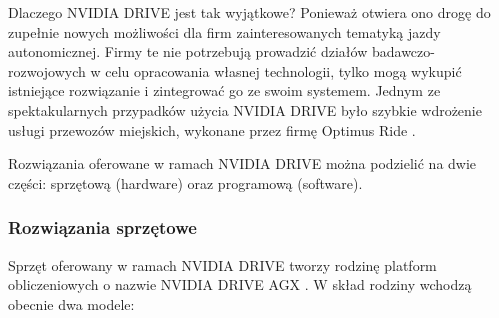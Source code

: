 Dlaczego NVIDIA DRIVE jest tak wyjątkowe? Ponieważ otwiera ono drogę do zupełnie nowych możliwości dla firm zainteresowanych tematyką jazdy autonomicznej. Firmy te nie potrzebują prowadzić działów badawczo-rozwojowych w celu opracowania własnej technologii, tylko mogą wykupić istniejące rozwiązanie i zintegrować go ze swoim systemem. Jednym ze spektakularnych przypadków użycia NVIDIA DRIVE było szybkie wdrożenie usługi przewozów miejskich, wykonane przez firmę Optimus Ride \cite{nvidiaDrive:optimusRide}.

Rozwiązania oferowane w ramach NVIDIA DRIVE można podzielić na dwie części: sprzętową (hardware) oraz programową (software).

\subsubsection{Rozwiązania sprzętowe}
Sprzęt oferowany w ramach NVIDIA DRIVE tworzy rodzinę platform obliczeniowych o nazwie NVIDIA DRIVE AGX \cite{nvidiaDrive:hardware}. W skład rodziny wchodzą obecnie dwa modele:
\vspace{-0.3cm}
